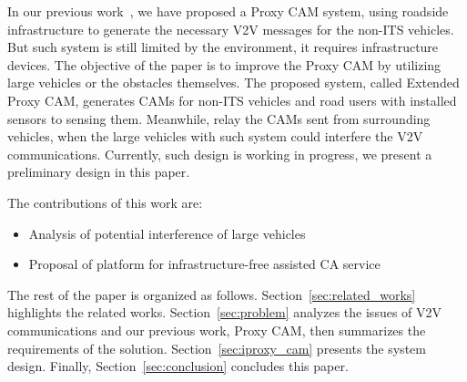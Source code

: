 In our previous work~\cite{kitazato2016proxy}, we have proposed a Proxy CAM system,
using roadside infrastructure to generate the necessary V2V messages for the non-ITS vehicles.
But such system is still limited by the environment, it requires infrastructure devices.
The objective of the paper is to improve the Proxy CAM by utilizing large vehicles or the obstacles themselves.
The proposed system, called Extended Proxy CAM,
generates CAMs for non-ITS vehicles and road users with installed sensors to sensing them.
Meanwhile, relay the CAMs sent from surrounding vehicles, when the large vehicles with such system could interfere the V2V communications.
Currently, such design is working in progress, we present a preliminary design in this paper.

The contributions of this work are:
\begin{itemize}
\item Analysis of potential interference of large vehicles
\item Proposal of platform for infrastructure-free assisted CA service
\end{itemize}

The rest of the paper is organized as follows.
Section~\ref{sec:related_works} highlights the related works.
Section~\ref{sec:problem} analyzes the issues of V2V communications and our previous work, Proxy CAM,
then summarizes the requirements of the solution.
Section~\ref{sec:iproxy_cam} presents the system design.
Finally, Section~\ref{sec:conclusion} concludes this paper.